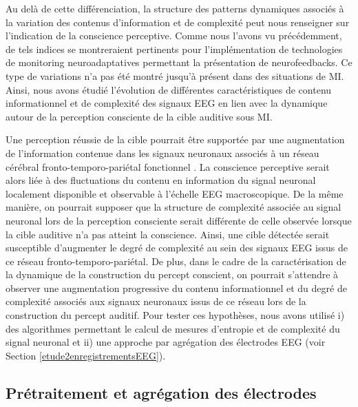 Au delà de cette différenciation, la structure des patterns dynamiques associés à la variation des contenus d'information et de complexité peut nous renseigner sur l'indication de la conscience perceptive. 
Comme nous l'avons vu précédemment, de tels indices se montreraient pertinents pour l'implémentation de technologies de monitoring neuroadaptatives permettant la présentation de neurofeedbacks. 
Ce type de variations n'a pas été montré jusqu'à présent dans des situations de MI.
Ainsi, nous avons étudié l'évolution de différentes caractéristiques de contenu informationnel et de complexité des signaux EEG en lien avec la dynamique autour de la perception consciente de la cible auditive sous MI. 

Une perception réussie de la cible pourrait être supportée par une augmentation de l'information contenue dans les signaux neuronaux associés à un réseau cérébral fronto-temporo-pariétal fonctionnel \citep{demertzi2013consciousness, eklund2019electrophysiological, eriksson2007similar, eriksson2017activity, giani2015detecting, wiegand2018cortical}. 
La conscience perceptive serait alors liée à des fluctuations du contenu en information du signal neuronal localement disponible et observable à l'échelle EEG macroscopique. 
De la même manière, on pourrait supposer que la structure de complexité associée au signal neuronal lors de la perception consciente serait différente de celle observée lorsque la cible auditive n'a pas atteint la conscience. 
Ainsi, une cible détectée serait susceptible d'augmenter le degré de complexité au sein des signaux EEG issus de ce réseau fronto-temporo-pariétal. 
De plus, dans le cadre de la caractérisation de la dynamique de la construction du percept conscient, on pourrait s'attendre à observer une augmentation progressive du contenu informationnel et du degré de complexité associés aux signaux neuronaux issus de ce réseau lors de la construction du percept auditif. 
Pour tester ces hypothèses, nous avons utilisé i) des algorithmes permettant le calcul de mesures d'entropie et de complexité du signal neuronal et ii) une approche par agrégation des électrodes EEG (voir Section \ref{etude2enregistrementsEEG}). 

\subsection{Prétraitement et agrégation des électrodes}
\label{pretraitementaggregationelectrodes}


